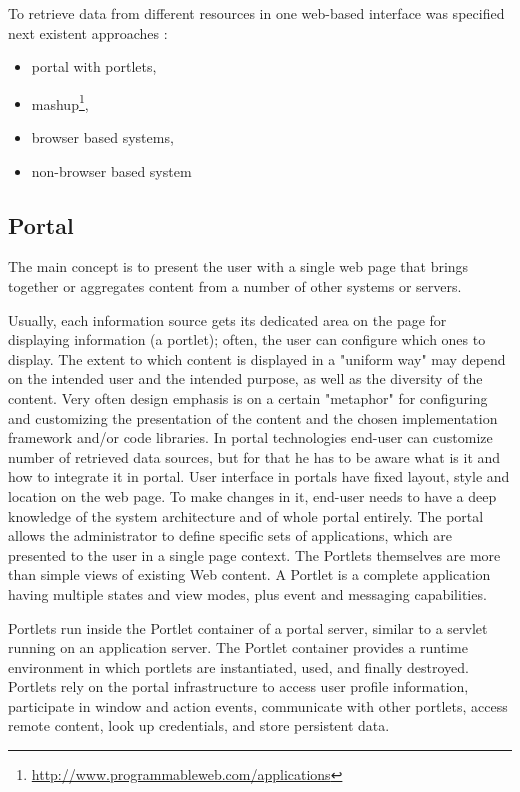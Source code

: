 To retrieve data from different resources in one web-based interface was specified next existent approaches :
\begin{itemize}
 \item portal with portlets,
 \item mashup\footnote{\url{http://www.programmableweb.com/applications}},
 \item browser based systems,
 \item non-browser based system
\end{itemize}

	\subsection{Portal}
		The main concept is to present the user with a single web page that brings together or aggregates content from a number of other systems or servers. 

		Usually, each information source gets its dedicated area on the page for displaying information (a portlet); often, the user can configure which ones to display. The extent to which content is displayed in a "uniform way" may depend on the intended user and the intended purpose, as well as the diversity of the content. Very often design emphasis is on a certain "metaphor" for configuring and customizing the presentation of the content and the chosen implementation framework and/or code libraries\cite{pautasso2008restful,seong2006usability}. In portal technologies end-user can customize number of retrieved data sources, but for that he has to be aware what is it and how to integrate it in portal. User interface in portals have fixed layout, style and location on the web page. To make changes in it, end-user needs to have a deep knowledge of the system architecture and of whole portal entirely. The portal allows the administrator to define specific sets of applications, which are presented to the user in a single page context. The Portlets themselves are more than simple views of existing Web content. A Portlet is a complete application having multiple states and view modes, plus event and messaging capabilities.

		Portlets run inside the Portlet container of a portal server, similar to a servlet running on an application server. The Portlet container provides a runtime environment in which portlets are instantiated, used, and finally destroyed. Portlets rely on the portal infrastructure to access user profile information, participate in window and action events, communicate with other portlets, access remote content, look up credentials, and store persistent data.

